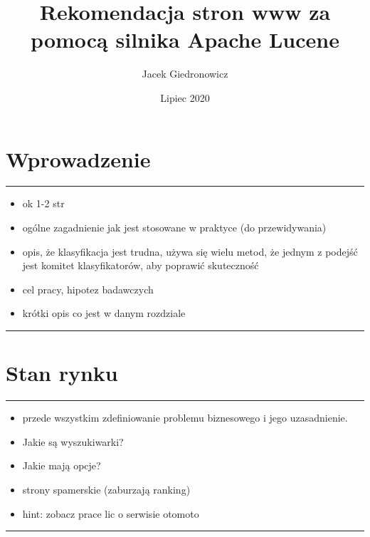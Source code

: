 \documentclass[licencjacka]{pracadypl}
\author{Jacek Giedronowicz}
\title{Rekomendacja stron www za pomocą silnika Apache Lucene }
\date{Lipiec 2020}
\theoremstyle{definition}
\newcommand{\linia}{\rule{\linewidth}{0.4mm}}
\begin{document}
\maketitle
\tableofcontents
\thispagestyle{empty}

\chapter{Wprowadzenie}

\linia
\begin{itemize}
	\item ok 1-2 str
	\item ogólne zagadnienie jak jest stosowane w praktyce (do przewidywania)
	\item opis, że klasyfikacja jest trudna, używa się wielu metod, że jednym z podejść jest komitet klasyfikatorów, aby poprawić skuteczność
	\item cel pracy, hipotez badawczych
	\item krótki opis co jest w danym rozdziale
\end{itemize}
	

\linia

\chapter{Stan rynku}

\linia
\begin{itemize}
	\item przede wszystkim zdefiniowanie problemu biznesowego i jego uzasadnienie.
	\item Jakie są wyszukiwarki?
	\item Jakie mają opcje?
	\item strony spamerskie (zaburzają ranking)
	\item hint: zobacz prace lic o serwisie otomoto
\end{itemize}

\linia
\end{document}
